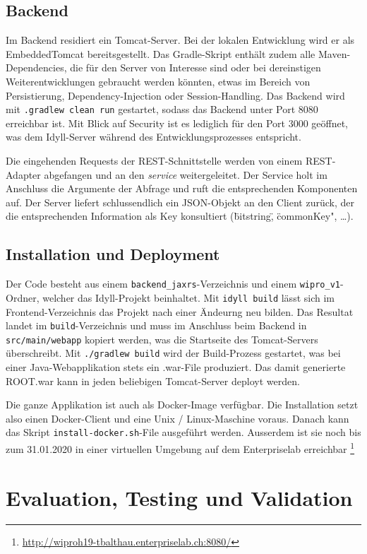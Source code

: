 \documentclass[a4paper,10.2pt,pdftex]{scrartcl}%
\begin{document}
\subsection{Backend}
Im Backend residiert ein Tomcat-Server. Bei der lokalen Entwicklung wird er als EmbeddedTomcat bereitsgestellt. Das Gradle-Skript enthält zudem alle Maven-Dependencies, die für den Server von Interesse sind oder bei dereinstigen Weiterentwicklungen gebraucht werden könnten, etwas im Bereich von Persistierung, Dependency-Injection oder Session-Handling. Das Backend wird mit \texttt{.gradlew clean run} gestartet, sodass das Backend unter Port 8080 erreichbar ist. Mit Blick auf Security ist es lediglich für den Port 3000 geöffnet, was dem Idyll-Server während des Entwicklungsprozesses entspricht. 

Die eingehenden Requests der REST-Schnittstelle werden von einem REST-Adapter abgefangen und an den \emph{service} weitergeleitet. Der Service holt im Anschluss die Argumente der Abfrage und ruft die entsprechenden Komponenten auf. Der Server liefert schlussendlich ein JSON-Objekt an den Client zurück, der die entsprechenden Information als Key konsultiert (\"bitstring\", \"commonKey", \dots). 


\subsection{Installation und Deployment}
Der Code besteht aus einem \texttt{backend\_jaxrs}-Verzeichnis und einem \texttt{wipro\_v1}-Ordner, welcher das Idyll-Projekt beinhaltet. Mit \texttt{idyll build} lässt sich im Frontend-Verzeichnis das Projekt nach einer Ändeurng neu bilden. Das Resultat landet im \texttt{build}-Verzeichnis und muss im Anschluss beim Backend in \texttt{src/main/webapp} kopiert werden, was die Startseite des Tomcat-Servers überschreibt. Mit \texttt{./gradlew build} wird der Build-Prozess gestartet, was bei einer Java-Webapplikation stets ein .war-File produziert. Das damit generierte ROOT.war kann in jeden beliebigen Tomcat-Server deployt werden. 

Die ganze Applikation ist auch als Docker-Image verfügbar. Die Installation setzt also einen Docker-Client und eine Unix / Linux-Maschine voraus. Danach kann das Skript \texttt{install-docker.sh}-File ausgeführt werden.  Ausserdem ist sie noch bis zum 31.01.2020 in einer virtuellen Umgebung auf dem Enterpriselab erreichbar \footnote{\url{http://wiproh19-tbalthau.enterpriselab.ch:8080/}}

\section{Evaluation, Testing und Validation}
\end{document}
